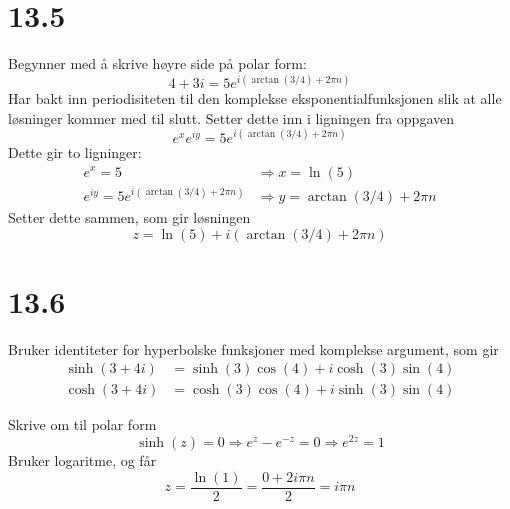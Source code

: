 \documentclass[11pt, a4paper, norsk]{NTNUoving}
\begin{document}
\section*{13.5}
\begin{oppgave}[20]
  Begynner med å skrive høyre side på polar form:
  \[
    4+3i = 5e^{i(\arctan(3/4) + 2\pi n)}
  \]
  Har bakt inn periodisiteten til den komplekse eksponentialfunksjonen slik at alle løsninger kommer med til slutt. Setter dette inn i ligningen fra oppgaven
  \[
    e^xe^{iy}=5e^{i(\arctan(3/4) + 2\pi n)}
  \]
  Dette gir to ligninger:
  \begin{align*}
    e^x = 5 &\Rightarrow x=\ln(5) \\
    e^{iy} = 5e^{i(\arctan(3/4) + 2\pi n)} &\Rightarrow y = \arctan(3/4) + 2\pi n
  \end{align*}
  Setter dette sammen, som gir løsningen
  \[
    z = \ln(5) + i (\arctan(3/4) + 2\pi n )
  \]
\end{oppgave}
\section*{13.6}
\begin{oppgave}[10]
  Bruker identiteter for hyperbolske funksjoner med komplekse argument, som gir
  \begin{align*}
    \sinh(3+4i) &= \sinh(3)\cos(4)+i\cosh(3)\sin(4) \\
    \cosh(3+4i) &= \cosh(3)\cos(4)+i\sinh(3)\sin(4)
  \end{align*}
\end{oppgave}
\begin{oppgave}[19]
  Skrive om til polar form
  \[
    \sinh(z)=0\Rightarrow e^z-e^{-z}=0\Rightarrow e^{2z}=1
  \]
  Bruker logaritme, og får
  \[
    z = \frac{\ln(1)}{2} = \frac{0+2i\pi n}{2} = i\pi n
  \]
\end{oppgave}
\newpage
\end{document}
